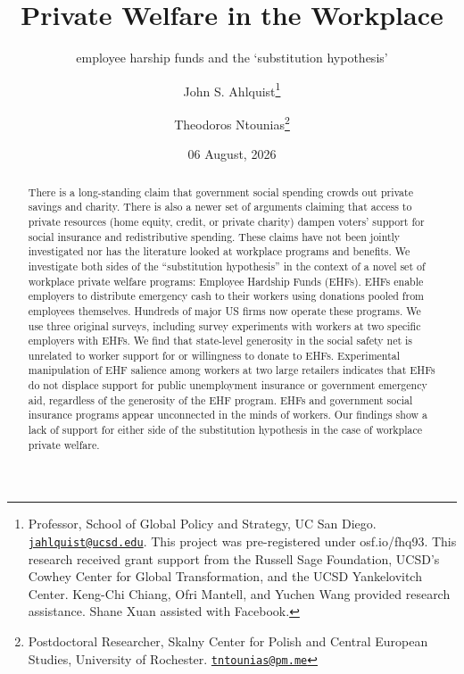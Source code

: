 \documentclass[
  11pt,
  oneside]{article}
\title{Private Welfare in the Workplace}
\subtitle{employee harship funds and the `substitution hypothesis'}
\author{John S. Ahlquist\footnote{Professor, School of Global Policy and Strategy, UC San Diego. \href{mailto:jahlquist@ucsd.edu}{\nolinkurl{jahlquist@ucsd.edu}}. This project was pre-registered under osf.io/fhq93. This research received grant support from the Russell Sage Foundation, UCSD's Cowhey Center for Global Transformation, and the UCSD Yankelovitch Center. Keng-Chi Chiang, Ofri Mantell, and Yuchen Wang provided research assistance. Shane Xuan assisted with Facebook.} \and Theodoros Ntounias\footnote{Postdoctoral Researcher, Skalny Center for Polish and Central European Studies, University of Rochester. \href{mailto:tntounias@pm.me}{\nolinkurl{tntounias@pm.me}}}}
\date{06 August, 2026}
\begin{document}
\maketitle

\begin{abstract}
\begin{singlespace} 

There is a long-standing claim that government social spending crowds out private savings and charity. There is also a newer set of arguments claiming that access to private resources (home equity, credit, or private charity) dampen voters' support for social insurance and redistributive spending. These claims have not been jointly investigated nor has the literature looked at workplace programs and benefits.  We investigate both sides of the ``substitution hypothesis'' in the context of a novel set of workplace private welfare programs: Employee Hardship Funds (EHFs). EHFs enable employers to distribute emergency cash to their workers using donations pooled from employees themselves. Hundreds of major US firms now operate these programs. We use three original surveys, including survey experiments with workers at two specific employers with EHFs.  We find that state-level generosity in the social safety net is unrelated to worker support for or willingness to donate to EHFs. Experimental manipulation of EHF salience among workers at two large retailers indicates that EHFs do not displace support for public unemployment insurance or government emergency aid, regardless of the generosity of the EHF program.  EHFs and government social insurance programs appear unconnected in the minds of workers. Our findings show a lack of support for either side of the substitution hypothesis in the case of workplace private welfare. \\


\end{singlespace}
\end{abstract}
\end{document}
